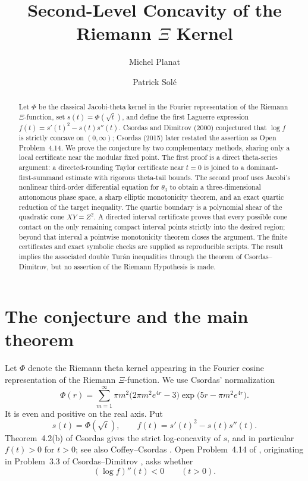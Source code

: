 \documentclass{amsart}
\title[Second-Level Concavity of the Riemann $\Xi$ Kernel]{Second-Level Concavity of the Riemann $\Xi$ Kernel}
\author{Michel Planat}
\author{Patrick Sol\'e}
\numberwithin{equation}{section}
\theoremstyle{definition}
\theoremstyle{remark}
\begin{document}
\begin{abstract}
Let $\Phi$ be the classical Jacobi-theta kernel in the Fourier representation of the Riemann $\Xi$-function, set $s(t)=\Phi(\sqrt t)$, and define the first Laguerre expression $f(t)=s'(t)^2-s(t)s''(t)$. Csordas and Dimitrov (2000) conjectured that $\log f$ is strictly concave on $(0,\infty)$; Csordas (2015) later restated the assertion as Open Problem~4.14. We prove the conjecture by two complementary methods, sharing only a local certificate near the modular fixed point. The first proof is a direct theta-series argument: a directed-rounding Taylor certificate near $t=0$ is joined to a dominant-first-summand estimate with rigorous theta-tail bounds. The second proof uses Jacobi's nonlinear third-order differential equation for $\theta_3$ to obtain a three-dimensional autonomous phase space, a sharp elliptic monotonicity theorem, and an exact quartic reduction of the target inequality. The quartic boundary is a polynomial shear of the quadratic cone $XY=Z^2$. A directed interval certificate proves that every possible cone contact on the only remaining compact interval points strictly into the desired region; beyond that interval a pointwise monotonicity theorem closes the argument. The finite certificates and exact symbolic checks are supplied as reproducible scripts. The result implies the associated double Tur\'an inequalities through the theorem of Csordas--Dimitrov, but no assertion of the Riemann Hypothesis is made.
\end{abstract}

\maketitle

\section{The conjecture and the main theorem}
Let $\Phi$ denote the Riemann theta kernel appearing in the Fourier cosine representation of the Riemann $\Xi$-function. We use Csordas' normalization
\begin{equation}\label{eq:Phi}
 \Phi(r)=\sum_{m=1}^{\infty}\pi m^2
 \bigl(2\pi m^2e^{4r}-3\bigr)
 \exp\!\bigl(5r-\pi m^2e^{4r}\bigr).
\end{equation}
It is even and positive on the real axis.  Put
\begin{equation}\label{eq:sf}
 s(t)=\Phi(\sqrt t),\qquad
 f(t)=s'(t)^2-s(t)s''(t).
\end{equation}
Theorem~4.2(b) of Csordas \cite{Csordas2015} gives the strict log-concavity of $s$, and in particular $f(t)>0$ for $t>0$; see also Coffey--Csordas \cite{CoffeyCsordas2013}.  Open Problem~4.14 of \cite{Csordas2015}, originating in Problem~3.3 of Csordas--Dimitrov \cite{CD2000}, asks whether
\begin{equation}\label{eq:CD}
 \boxed{\qquad (\log f)''(t)<0\qquad(t>0).\qquad}
\end{equation}
\end{document}
